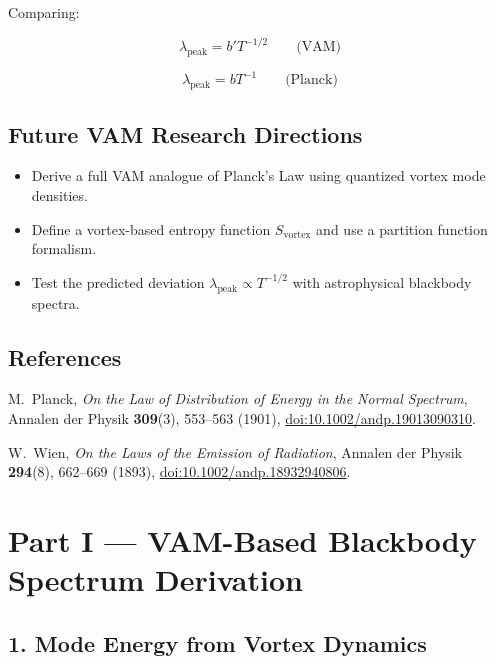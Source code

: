 \documentclass[12pt]{article}
\begin{document}
Comparing:

\begin{equation}
\lambda_{\text{peak}} = b' T^{-1/2}
\qquad \text{(VAM)}
\end{equation}

\begin{equation}
\lambda_{\text{peak}} = b T^{-1}
\qquad \text{(Planck)}
\end{equation}

\subsection{Future VAM Research Directions}

\begin{itemize}
    \item Derive a full VAM analogue of Planck's Law using quantized vortex mode densities.
    \item Define a vortex-based entropy function \( S_{\text{vortex}} \) and use a partition function formalism.
    \item Test the predicted deviation \( \lambda_{\text{peak}} \propto T^{-1/2} \) with astrophysical blackbody spectra.
\end{itemize}

\subsection*{References}

\begin{thebibliography}{9}

M.~Planck,
\newblock \emph{On the Law of Distribution of Energy in the Normal Spectrum},
\newblock Annalen der Physik \textbf{309}(3), 553–563 (1901),
\newblock \href{https://doi.org/10.1002/andp.19013090310}{doi:10.1002/andp.19013090310}.

W.~Wien,
\newblock \emph{On the Laws of the Emission of Radiation},
\newblock Annalen der Physik \textbf{294}(8), 662–669 (1893),
\newblock \href{https://doi.org/10.1002/andp.18932940806}{doi:10.1002/andp.18932940806}.

\end{thebibliography}

\section*{Part I — VAM-Based Blackbody Spectrum Derivation}

\subsection*{1. Mode Energy from Vortex Dynamics}
\end{document}
